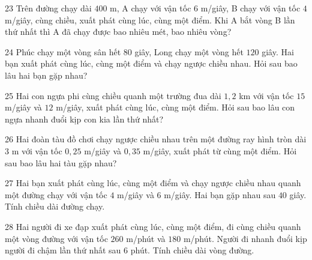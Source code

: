 \gap
\begin{probbox}{23}{\relax}
Trên đường chạy dài $400$ m, A chạy với vận tốc $6$ m/giây, B chạy với vận tốc $4$ m/giây, cùng chiều, xuất phát cùng lúc, cùng một điểm. Khi A bắt vòng B lần thứ nhất thì A đã chạy được bao nhiêu mét, bao nhiêu vòng?
\end{probbox}
\gap
\begin{probbox}{24}{\relax}
Phúc chạy một vòng sân hết $80$ giây, Long chạy một vòng hết $120$ giây. Hai bạn xuất phát cùng lúc, cùng một điểm và chạy ngược chiều nhau. Hỏi sau bao lâu hai bạn gặp nhau?
\end{probbox}
\gap
\begin{probbox}{25}{\relax}
Hai con ngựa phi cùng chiều quanh một trường đua dài $1{,}2$ km với vận tốc $15$ m/giây và $12$ m/giây, xuất phát cùng lúc, cùng một điểm. Hỏi sau bao lâu con ngựa nhanh đuổi kịp con kia lần thứ nhất?
\end{probbox}
\gap
\begin{probbox}{26}{\relax}
Hai đoàn tàu đồ chơi chạy ngược chiều nhau trên một đường ray hình tròn dài $3$ m với vận tốc $0{,}25$ m/giây và $0{,}35$ m/giây, xuất phát từ cùng một điểm. Hỏi sau bao lâu hai tàu gặp nhau?
\end{probbox}
\gap
\begin{probbox}{27}{\relax}
Hai bạn xuất phát cùng lúc, cùng một điểm và chạy ngược chiều nhau quanh một đường chạy với vận tốc $4$ m/giây và $6$ m/giây. Hai bạn gặp nhau sau $40$ giây. Tính chiều dài đường chạy.
\end{probbox}
\gap
\begin{probbox}{28}{\relax}
Hai người đi xe đạp xuất phát cùng lúc, cùng một điểm, đi cùng chiều quanh một vòng đường với vận tốc $260$ m/phút và $180$ m/phút. Người đi nhanh đuổi kịp người đi chậm lần thứ nhất sau $6$ phút. Tính chiều dài vòng đường.
\end{probbox}
